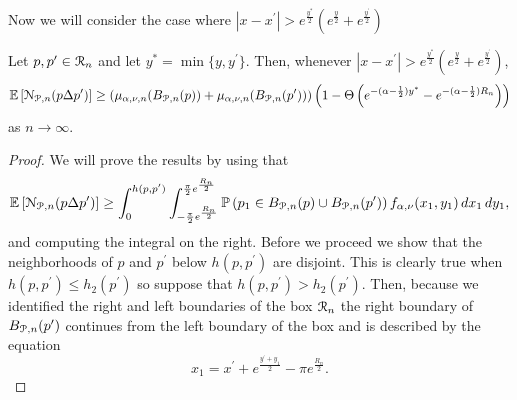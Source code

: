 \begin{appendices}
Now we will consider the case where $|x - x^\prime| > e^{\frac{y^\ast}{2}}\left(e^{\frac{y}{2}} + e^{\frac{y^\prime}{2}}\right)$

\begin{lemma}\label{lem:disjoint_neighbors_P_n_large}
Let $p, p ^\prime \in {\mathcal R}_n$ and let $y^\ast = \min\{y,y^\prime\}$. Then, whenever $|x - x^\prime| > e^{\frac{y^\ast}{2}}\left(e^{\frac{y}{2}} + e^{\frac{y^\prime}{2}}\right)$,
\[
	\mathbb{E}\left[{\mathcal N}_{{\mathcal P},n}(p\Delta p^\prime)\right]
	\ge \left(\mu_{\alpha,\nu ,n}(B_{{\mathcal P},n}(p)) + \mu_{\alpha,\nu ,n}(B_{{\mathcal P},n}(p^\prime))\right)
		\left(1-\Theta\left(e^{-(\alpha - \frac{1}{2})y^\ast} - e^{-(\alpha - \frac{1}{2})R_n}\right)\right)
\]
as $n \to \infty$.
\end{lemma}

\begin{proof}
We will prove the results by using that
\[
	\mathbb{E}\left[{\mathcal N}_{{\mathcal P},n}(p\Delta p^\prime)\right] 
	\ge \int_0^{h(p,p^\prime)} \int_{-\frac{\pi}{2}e^{\frac{R_n}{2}}}^{\frac{\pi}{2}e^{\frac{R_n}{2}}} \mathbb{P}\left(p_1 \in B_{{\mathcal P},n}(p) \cup B_{{\mathcal P},n}(p^\prime)\right) f_{\alpha,\nu}(x_1,y_1) \, dx_1 \, dy_1,
\]
and computing the integral on the right. Before we proceed we show that the neighborhoods of $p$ and $p^\prime$ below $h(p,p^\prime)$ are disjoint. This is clearly true when $h(p,p^\prime) \le h_2(p^\prime)$ so suppose that $h(p,p^\prime) > h_2(p^\prime)$. Then, because we identified the right and left boundaries of the box ${\mathcal R}_n$ the right boundary of $B_{{\mathcal P},n}(p^\prime)$ continues from the left boundary of the box and is described by the equation
\[
	x_1 = x^\prime + e^{\frac{y^\prime + y_1}{2}} - \pi e^{\frac{R_n}{2}}.
\]
\end{proof}
\end{appendices}

